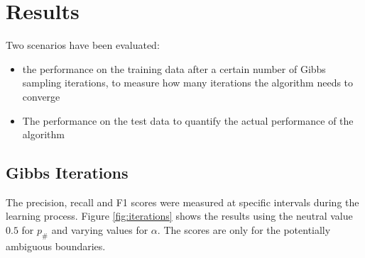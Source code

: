 \documentclass[11pt]{article}
\begin{document}
\section{Results}
Two scenarios have been evaluated:
\begin{itemize}
  \item the performance on the training data after a certain number of Gibbs
    sampling iterations, to measure how many iterations the algorithm needs to
    converge
  \item The performance on the test data to quantify the actual performance of
    the algorithm
\end{itemize}

\subsection{Gibbs Iterations}
\FloatBarrier
The precision, recall and F1 scores were measured at specific intervals during
the learning process. Figure \ref{fig:iterations} shows the results using the
neutral value $0.5$ for $p_\#$ and varying values for $\alpha$. The scores are
only for the potentially ambiguous boundaries.
\end{document}

